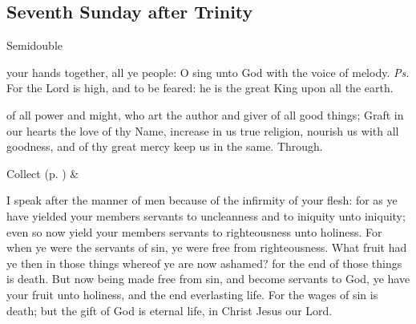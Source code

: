 \clearpage
\subsection{Seventh Sunday after Trinity}
\begin{inhead}
    {Semidouble}
\end{inhead}


\introit
{} your hands together, all ye people: O sing unto God with the voice of melody. \textit{Ps.} For the Lord is high, and to be feared: he is the great King upon all the earth.

\collect
{} of all power and might, who art the author and giver of all good things; Graft in our hearts the love of thy Name, increase in us true religion, nourish us with all goodness, and of thy great mercy keep us in the same. Through.

\begin{rubric}
     Collect  (p. \pageref{SPSaints}) \&  
\end{rubric}

 I speak after the manner of men because of the infirmity of your flesh: for as ye have yielded your members servants to uncleanness and to iniquity unto iniquity; even so now yield your members servants to righteousness unto holiness. For when ye were the servants of sin, ye were free from righteousness. What fruit had ye then in those things whereof ye are now ashamed? for the end of those things is death. But now being made free from sin, and become servants to God, ye have your fruit unto holiness, and the end everlasting life. For the wages of sin is death; but the gift of God is eternal life, in Christ Jesus our Lord.



